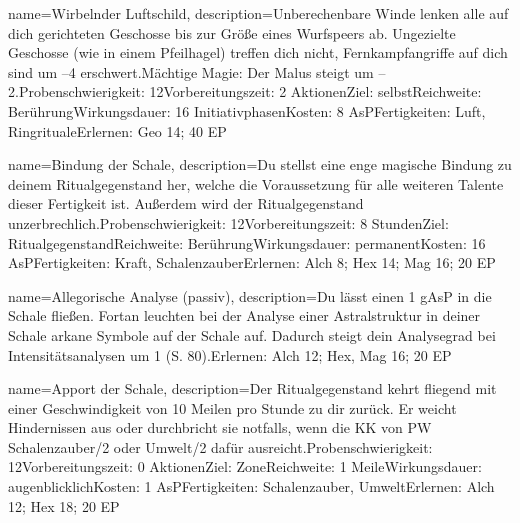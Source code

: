 {
    name={Wirbelnder Luftschild},
    description={Unberechenbare Winde lenken alle auf dich gerichteten Geschosse bis zur Größe eines Wurfspeers ab. Ungezielte Geschosse (wie in einem Pfeilhagel) treffen dich nicht, Fernkampfangriffe auf dich sind um –4 erschwert.\newline Mächtige Magie: Der Malus steigt um –2.\newline Probenschwierigkeit: 12\newline Vorbereitungszeit: 2 Aktionen\newline Ziel: selbst\newline Reichweite: Berührung\newline Wirkungsdauer: 16 Initiativphasen\newline Kosten: 8 AsP\newline Fertigkeiten: Luft, Ringrituale\newline Erlernen: Geo 14; 40 EP}
}


{
    name={Bindung der Schale},
    description={Du stellst eine enge magische Bindung zu deinem Ritualgegenstand her, welche die Voraussetzung für alle weiteren Talente dieser Fertigkeit ist. Außerdem wird der Ritualgegenstand unzerbrechlich.\newline Probenschwierigkeit: 12\newline Vorbereitungszeit: 8 Stunden\newline Ziel: Ritualgegenstand\newline Reichweite: Berührung\newline Wirkungsdauer: permanent\newline Kosten: 16 AsP\newline Fertigkeiten: Kraft, Schalenzauber\newline Erlernen: Alch 8; Hex 14; Mag 16; 20 EP}
}


{
    name={Allegorische Analyse (passiv)},
    description={Du lässt einen 1 gAsP in die Schale fließen. Fortan leuchten bei der Analyse einer Astralstruktur in deiner Schale arkane Symbole auf der Schale auf. Dadurch steigt dein Analysegrad bei Intensitätsanalysen um 1 (S. 80).\newline Erlernen: Alch 12; Hex, Mag 16; 20 EP}
}


{
    name={Apport der Schale},
    description={Der Ritualgegenstand kehrt fliegend mit einer Geschwindigkeit von 10 Meilen pro Stunde zu dir zurück. Er weicht Hindernissen aus oder durchbricht sie notfalls, wenn die KK von PW Schalenzauber/2 oder Umwelt/2 dafür ausreicht.\newline Probenschwierigkeit: 12\newline Vorbereitungszeit: 0 Aktionen\newline Ziel: Zone\newline Reichweite: 1 Meile\newline Wirkungsdauer: augenblicklich\newline Kosten: 1 AsP\newline Fertigkeiten: Schalenzauber, Umwelt\newline Erlernen: Alch 12; Hex 18; 20 EP}
}


